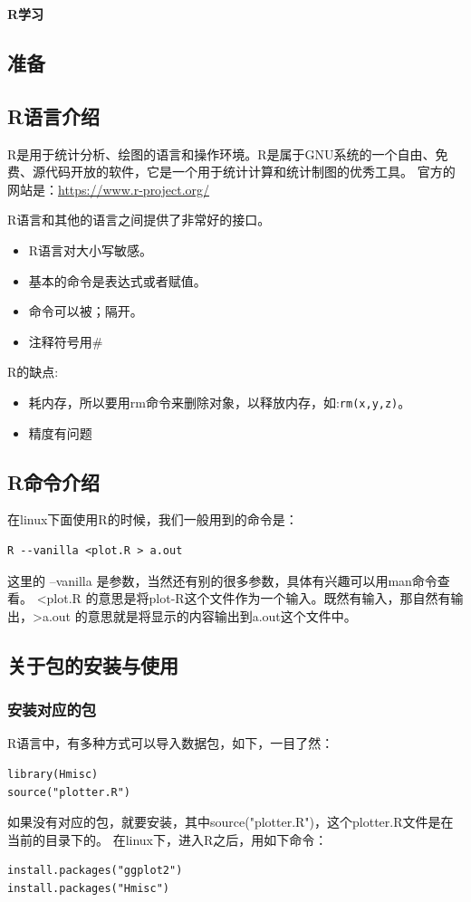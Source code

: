 \documentclass[a4paper,12pt]{ctexbook}
\begin{document}
\begin{center}
\huge \textbf{R学习~\cite{R}}
\end{center}

\tableofcontents
\newpage
\begin{flushleft}

\chapter{准备}
\section{R语言介绍}
R是用于统计分析、绘图的语言和操作环境。R是属于GNU系统的一个自由、免费、源代码开放的软件，它是一个用于统计计算和统计制图的优秀工具。
官方的网站是：\url{https://www.r-project.org/}

R语言和其他的语言之间提供了非常好的接口。
\begin{itemize}
  \item R语言对大小写敏感。
  \item 基本的命令是表达式或者赋值。
  \item 命令可以被；隔开。
  \item 注释符号用\#
\end{itemize}

R的缺点:
\begin{itemize}
  \item 耗内存，所以要用rm命令来删除对象，以释放内存，如:\verb|rm(x,y,z)|。
  \item 精度有问题
\end{itemize}

\section{R命令介绍}
在linux下面使用R的时候，我们一般用到的命令是：
\begin{verbatim}
R --vanilla <plot.R > a.out
\end{verbatim}
这里的 --vanilla 是参数，当然还有别的很多参数，具体有兴趣可以用man命令查看。
<plot.R 的意思是将plot-R这个文件作为一个输入。既然有输入，那自然有输出，>a.out 的意思就是将显示的内容输出到a.out这个文件中。

\section{关于包的安装与使用}
\subsection{安装对应的包}
\label{install_package}
R语言中，有多种方式可以导入数据包，如下，一目了然：
\begin{verbatim}
library(Hmisc)
source("plotter.R")
\end{verbatim}
如果没有对应的包，就要安装，其中source("plotter.R")，这个plotter.R文件是在当前的目录下的。
在linux下，进入R之后，用如下命令：
\begin{verbatim}
install.packages("ggplot2")
install.packages("Hmisc")
\end{verbatim}

\end{flushleft}
\end{document}
